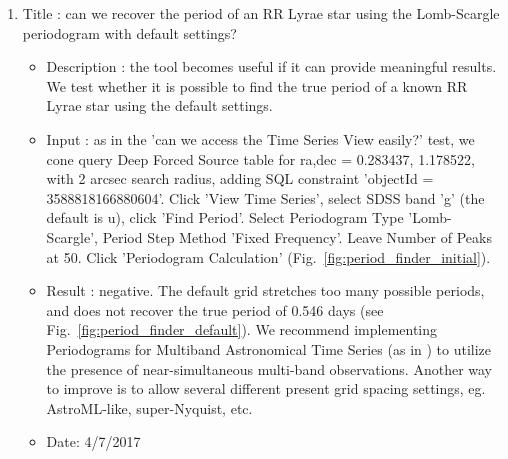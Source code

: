 \documentclass[DM,lsstdraft,toc]{lsstdoc}
\begin{document}
\begin{enumerate}
   \item Title : can we recover the period of an RR Lyrae star using the Lomb-Scargle periodogram with default settings?
    \begin{itemize}
      \item Description : the tool becomes useful if it can provide meaningful results.  We test whether it is possible to find the true period of a known RR Lyrae star using the default  settings.
      \item Input : as in the 'can we access the Time Series View easily?' test,  we cone query Deep Forced Source table for ra,dec = 0.283437\degree, 1.178522\degree, with 2 arcsec search radius, adding SQL constraint 'objectId = 3588818166880604'. Click 'View Time Series', select SDSS band 'g' (the default is u), click 'Find Period'. Select Periodogram Type 'Lomb-Scargle', Period Step Method 'Fixed Frequency'. Leave Number of Peaks at 50. Click 'Periodogram Calculation' (Fig.~\ref{fig:period_finder_initial}).
      \item Result : negative. The default grid stretches too many possible periods, and does not recover the true period of 0.546 days (see Fig.~\ref{fig:period_finder_default}). We recommend implementing  Periodograms for Multiband Astronomical Time Series (as in \cite{2015ApJ...812...18V}) to utilize the presence of near-simultaneous multi-band observations. Another way to improve is to allow several different present grid spacing settings,  eg.  AstroML-like, super-Nyquist, etc.
      \item Date: 4/7/2017
    \end{itemize}


\end{enumerate}
\end{document}
